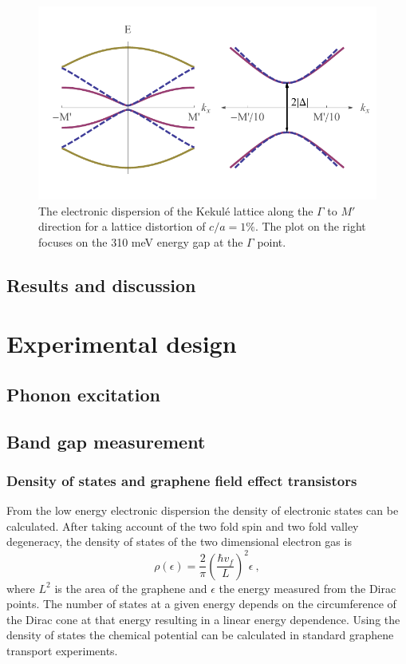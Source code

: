 \begin{figure}
	\begin{center}
	\includegraphics{Figs_Kekule/gapped.pdf}
	\end{center}
	\caption[Gapped electronic dispersion of the Kekul\'e lattice]{\label{fig:kek:gapped}
		The electronic dispersion of the Kekul\'e lattice along the $\Gamma$ to $M'$ direction for a lattice distortion of $c/a=1\%$.
		The plot on the right focuses on the 310 meV energy gap at the $\Gamma$ point.
	}
\end{figure}

\subsection{Results and discussion}

\section{Experimental design}
\subsection{Phonon excitation}

\subsection{Band gap measurement}

\subsubsection{Density of states and graphene field effect transistors}
From the low energy electronic dispersion the density of electronic states can be calculated.
After taking account of the two fold spin and two fold valley degeneracy, the density of states of the two dimensional electron gas is
\begin{equation*}
	\rho(\epsilon)=\frac{2}{\pi} \left( \frac{\hbar v_f}{L} \right)^2 \epsilon \ ,
\end{equation*}
where $L^2$ is the area of the graphene and $\epsilon$ the energy measured from the Dirac points.
The number of states at a given energy depends on the circumference of the Dirac cone at that energy resulting in a linear energy dependence.
Using the density of states the chemical potential can be calculated in standard graphene transport experiments.

